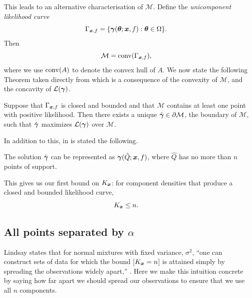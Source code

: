 	This leads to an alternative characterisation of $\mathcal{M}$. Define the \emph{unicomponent likelihood curve}
	\begin{equation}
		\Gamma_{{\bm{{x}}}, f} = \{{\bm{{\gamma}}}({\bm{{\theta}}}; {\bm{{x}}}, f) : {\bm{{\theta}}} \in \Omega\}.
	\end{equation}
	Then
	\begin{equation}
		\mathcal{M} = \mathrm{conv}(\Gamma_{{\bm{{x}}}, f}),
	\end{equation}
	where we use $\mathrm{conv}(A)$ to denote the convex hull of $A$. We now state the following Theorem taken directly from \cite[Theorem 18]{Lindsay1995-sq} which is a consequence of the convexity of $\mathcal{M}$, and the concavity of $\mathcal{L}({\bm{{\gamma}}})$.

	\begin{theorem}
		Suppose that $\Gamma_{{\bm{{x}}}, f}$ is closed and bounded and that $\mathcal{M}$ contains at least one point with positive likelihood. Then there exists a unique $\hat{{\bm{{\gamma}}}} \in \partial \mathcal{M}$, the boundary of $\mathcal{M}$, such that $\hat{{\bm{{\gamma}}}}$ maximizes $\mathcal{L}({\bm{{\gamma}}})$ over $\mathcal{M}$.
		\label{thm: lindsay maximizing likelihood vector point}
	\end{theorem}

	In addition to this, in \cite[Theorem 21]{Lindsay1995-sq} is stated the following.
	\begin{theorem}
		The solution $\hat{{\bm{{\gamma}}}}$ can be represented as ${\bm{{\gamma}}}(\hat{Q};{\bm{{x}}}, f)$, where $\hat{Q}$ has no more than $n$ points of support.
		\label{thm: lindsay no more than n points}
	\end{theorem}
	This gives us our first bound on $K_{\bm{{x}}}$: for component densities that produce a closed and bounded likelihood curve,
	\begin{equation}
		K_{\bm{{x}}} \leq n.
	\end{equation}

	\subsection{All points separated by \texorpdfstring{$\alpha$}{a}}
		Lindsay states that for normal mixtures with fixed variance, $\sigma^2$, ``one can construct sets of data for which the bound [$K_{\bm{{x}}} = n$] is attained simply by spreading the observations widely apart,'' \cite[Section 5.2]{Lindsay1995-sq}. Here we make this intuition concrete by saying how far apart we should spread our observations to ensure that we use all $n$ components.

